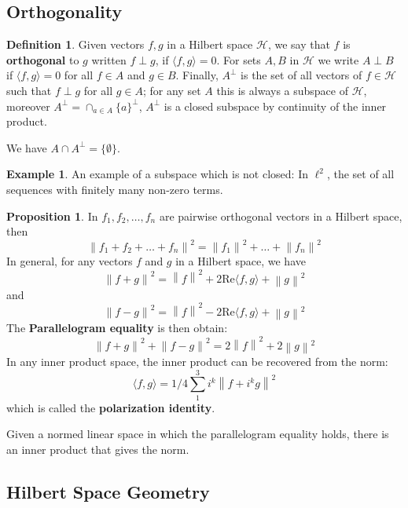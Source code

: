 \documentclass{article}
\theoremstyle{definition}
\newtheorem{example}{Example}
\newtheorem*{defn}{Definition}
\newtheorem{proposition}{Proposition}
\newcommand{\norm}[1]{\left\lVert#1\right\rVert}
\begin{document}
    \subsection{Orthogonality}

    \begin{defn}
        Given vectors $f,g$ in a Hilbert space $\mathcal{H}$, we say that $f$ is \textbf{orthogonal} to $g$ written $f\perp g$,
        if $\langle f,g\rangle = 0$. For sets $A,B$ in $\mathcal{H}$ we write $A\perp B$ if $\langle f,g\rangle = 0$ for all
        $f\in A$ and $g\in B$. Finally, $A^{\perp}$ is the set of all vectors of $f\in\mathcal{H}$ such that $f\perp g$ for all
        $g\in A$; for any set $A$ this is always a subspace of $\mathcal{H}$, moreover $A^{\perp} = \cap_{a\in A} \{a\}^{\perp}$,
        $A^{\perp}$ is a closed subspace by continuity of the inner product.
    \end{defn}

    We have $A\cap A^{\perp}=\{\emptyset\}$.

    \begin{example}
        An example of a subspace which is not closed: In $\ell^2$, the set of all sequences with finitely many non-zero terms.
    \end{example}

    \begin{proposition}
        In $f_1,f_2,\hdots,f_n$ are pairwise orthogonal vectors in a Hilbert space, then
        \[ \norm{f_1+f_2+\hdots+f_n}^2 = \norm{f_1}^2 + \hdots + \norm{f_n}^2 \]
        In general, for any vectors $f$ and $g$ in a Hilbert space, we have
        \[ \norm{f+g}^2 = \norm{f}^2 + 2\text{Re}\langle f,g\rangle + \norm{g}^2 \]
        and
        \[ \norm{f-g}^2 = \norm{f}^2 - 2\text{Re}\langle f,g\rangle + \norm{g}^2 \]
        The \textbf{Parallelogram equality} is then obtain:
        \[ \norm{f+g}^2 + \norm{f-g}^2 = 2\norm{f}^2 + 2\norm{g}^2 \]
        In any inner product space, the inner product can be recovered from the norm:
        \[ \langle f,g\rangle = 1/4\sum_1^3 i^k\norm{f+i^kg}^2 \]
        which is called the \textbf{polarization identity}.
    \end{proposition}

    Given a normed linear space in which the parallelogram equality holds, there is an inner product that gives the norm.

    \subsection{Hilbert Space Geometry}
\end{document}
